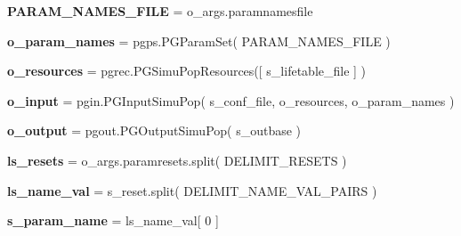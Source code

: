 \begin{DoxyCompactItemize}
\item 
{\bfseries P\+A\+R\+A\+M\+\_\+\+N\+A\+M\+E\+S\+\_\+\+F\+I\+LE} = o\+\_\+args.\+paramnamesfile\hypertarget{namespacenegui_1_1pgopsimupop_a64d2c0016636c17206eb8ef0251da285}{}\label{namespacenegui_1_1pgopsimupop_a64d2c0016636c17206eb8ef0251da285}

\item 
{\bfseries o\+\_\+param\+\_\+names} = pgps.\+P\+G\+Param\+Set( P\+A\+R\+A\+M\+\_\+\+N\+A\+M\+E\+S\+\_\+\+F\+I\+LE )\hypertarget{namespacenegui_1_1pgopsimupop_a19188f6d1a8be14d817f714253f72524}{}\label{namespacenegui_1_1pgopsimupop_a19188f6d1a8be14d817f714253f72524}

\item 
{\bfseries o\+\_\+resources} = pgrec.\+P\+G\+Simu\+Pop\+Resources(\mbox{[} s\+\_\+lifetable\+\_\+file \mbox{]} )\hypertarget{namespacenegui_1_1pgopsimupop_a2e48d554443220321fa4e2d7d54ce6d0}{}\label{namespacenegui_1_1pgopsimupop_a2e48d554443220321fa4e2d7d54ce6d0}

\item 
{\bfseries o\+\_\+input} = pgin.\+P\+G\+Input\+Simu\+Pop( s\+\_\+conf\+\_\+file, o\+\_\+resources, o\+\_\+param\+\_\+names )\hypertarget{namespacenegui_1_1pgopsimupop_af6081fd95bb8d80f4596802ee94584f4}{}\label{namespacenegui_1_1pgopsimupop_af6081fd95bb8d80f4596802ee94584f4}

\item 
{\bfseries o\+\_\+output} = pgout.\+P\+G\+Output\+Simu\+Pop( s\+\_\+outbase )\hypertarget{namespacenegui_1_1pgopsimupop_a7a8ef84b45b8957cdb95d853da85e2a6}{}\label{namespacenegui_1_1pgopsimupop_a7a8ef84b45b8957cdb95d853da85e2a6}

\item 
{\bfseries ls\+\_\+resets} = o\+\_\+args.\+paramresets.\+split( D\+E\+L\+I\+M\+I\+T\+\_\+\+R\+E\+S\+E\+TS )\hypertarget{namespacenegui_1_1pgopsimupop_a9eae9fae79b6708eed40aa9e9edb92a6}{}\label{namespacenegui_1_1pgopsimupop_a9eae9fae79b6708eed40aa9e9edb92a6}

\item 
{\bfseries ls\+\_\+name\+\_\+val} = s\+\_\+reset.\+split( D\+E\+L\+I\+M\+I\+T\+\_\+\+N\+A\+M\+E\+\_\+\+V\+A\+L\+\_\+\+P\+A\+I\+RS )\hypertarget{namespacenegui_1_1pgopsimupop_ad82b219b8f67412d4fbf95619dd71429}{}\label{namespacenegui_1_1pgopsimupop_ad82b219b8f67412d4fbf95619dd71429}

\item 
{\bfseries s\+\_\+param\+\_\+name} = ls\+\_\+name\+\_\+val\mbox{[} 0 \mbox{]}\hypertarget{namespacenegui_1_1pgopsimupop_ac8fabcdd7215fc482007a33fd1693b53}{}\label{namespacenegui_1_1pgopsimupop_ac8fabcdd7215fc482007a33fd1693b53}


\end{DoxyCompactItemize}
